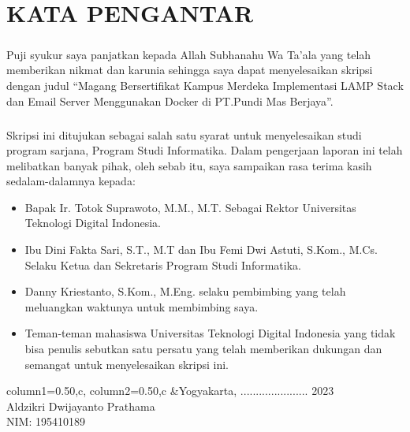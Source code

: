 \documentclass[../SKRIPSI_ALDZIKRI_DWIJAYANTO_PRATHAMA.tex]{subfiles}
\begin{document}
\chapter*{KATA PENGANTAR}
\begin{doublespace}
\paragraph*{}Puji syukur saya panjatkan kepada Allah
Subhanahu Wa Ta’ala yang telah memberikan nikmat dan
karunia sehingga saya dapat menyelesaikan skripsi dengan
judul “Magang Bersertifikat Kampus Merdeka Implementasi LAMP Stack dan Email Server Menggunakan Docker di PT.Pundi Mas Berjaya”.

\paragraph*{}Skripsi ini ditujukan sebagai salah satu syarat untuk
menyelesaikan studi program sarjana, Program Studi
Informatika. Dalam pengerjaan laporan ini telah  melibatkan
banyak pihak, oleh sebab itu, saya sampaikan rasa terima
kasih  sedalam-dalamnya kepada: \\
\begin{itemize}
  \item Bapak Ir. Totok Suprawoto, M.M., M.T. Sebagai Rektor
  Universitas Teknologi Digital Indonesia.
  \item Ibu Dini Fakta Sari, S.T., M.T dan Ibu Femi Dwi
    Astuti, S.Kom., M.Cs. Selaku Ketua dan Sekretaris Program Studi Informatika.
  \item Danny Kriestanto, S.Kom., M.Eng. selaku pembimbing yang
  telah meluangkan waktunya untuk membimbing saya.
  \item Teman-teman mahasiswa Universitas Teknologi Digital Indonesia yang tidak bisa penulis sebutkan satu persatu yang telah memberikan dukungan dan semangat untuk menyelesaikan skripsi ini.
\end{itemize}
\end{doublespace}
\begin{tblr}{column{1}={0.50\linewidth,c},
column{2}={0.50\linewidth,c}}
  &{Yogyakarta, ...................... 2023\\
    \vspace*{3cm}
    Aldzikri Dwijayanto Prathama\\
    NIM: 195410189}
\end{tblr}
\end{document}
